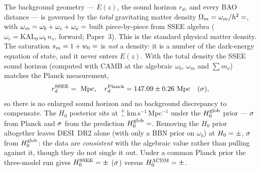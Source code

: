 \documentclass[12pt,a4paper]{article}
\newcommand{\SSEE}{\ifmmode\mathrm{SSEE}\else\textsc{ssee}\fi}
\newcommand{\LCDM}{\ifmmode\Lambda\mathrm{CDM}\else$\Lambda$CDM\fi}
\newcommand{\HZeroPosterior}{\val{h0_p2}^{+\val{h0_p2_mas}}_{-\val{h0_p2_menos}}}
\begin{document}
The background geometry --- $E(z)$, the sound horizon $r_d$, and every BAO
distance --- is governed by the \emph{total} gravitating matter density
$\Omega_m = \omega_m/h^2 = \val{OMEGA_M_TOTAL_d6}$, with
$\omega_m=\omega_b+\omega_c+\omega_\nu=\val{OMEGA_M_H2_d5}$ built piece-by-piece from SSEE
algebra ($\omega_c=\mathrm{KAL_0}\,\omega_b\,n_s$, forward; Paper~3). This is
the standard physical matter density. The saturation $s_m=1+w_0=\val{S_M_d6}$ is
\emph{not} a density: it is a number of the dark-energy equation of state, and
it never enters $E(z)$.
With the total density the SSEE sound horizon (computed with CAMB at the
algebraic $\omega_b$, $\omega_m$ and $\sum m_\nu$) matches the Planck measurement,
\begin{equation}
  r_d^{\SSEE}=\val{p2_lyaB_rd}\ \text{Mpc},\quad
  r_d^{\rm Planck}=147.09\pm0.26\ \text{Mpc}\quad(\val{p3_rd_sig_post}\sigma),
  \label{eq:rd_ratio}
\end{equation}
so there is no enlarged sound horizon and no background discrepancy to
compensate. The $H_0$ posterior sits at $\HZeroPosterior$\,km\,s$^{-1}$\,Mpc$^{-1}$
under the $H_0^{\rm glob}$ prior --- $\val{h0_p2_dplanck}\sigma$ from Planck and $\val{h0_p2_dhglob}\sigma$
from the prediction $H_0^{\rm glob}=\val{H0_GLOBAL_d3}$. Removing the $H_0$ prior
altogether leaves DESI~DR2 alone (with only a BBN prior on $\omega_b$) at
$H_0=\val{h0_desi_plano}\pm\val{h0_desi_plano_s}$, $\val{h0_desi_plano_dhglob}\sigma$ from $H_0^{\rm glob}$: the data are
\emph{consistent} with the algebraic value rather than pulling against it,
though they do not single it out. Under a common
Planck prior the three-model run gives $H_0^{\SSEE}=\val{p2_ssee_H0_mediana}\pm\val{p2_ssee_H0_std}$
($\val{p2_tH0_planck}\sigma$) versus $H_0^{\LCDM}=\val{p2_lcdm_H0_mediana}\pm\val{p2_lcdm_H0_std}$.
\end{document}

